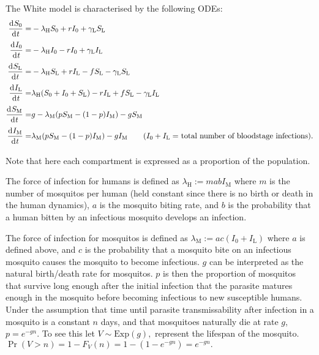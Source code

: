 The White model is characterised by the following
ODEs:
\begin{align*}
    \frac{\diff S_0}{\diff t}
    = & -\lambda_\mathrm{H} S_0 + rI_0 + \gamma_\mathrm{L}S_\mathrm{L} \\
    \frac{\diff I_0}{\diff t}
    = & -\lambda_\mathrm{H} I_0 - rI_0 + \gamma_\mathrm{L}I_\mathrm{L} \\
    \frac{\diff S_\mathrm{L}}{\diff t}
    = & -\lambda_\mathrm{H} S_\mathrm{L} + rI_\mathrm{L}
    - fS_\mathrm{L} -\gamma_\mathrm{L}S_\mathrm{L}                     \\
    \frac{\diff I_\mathrm{L}}{\diff t}
    = & \lambda_\mathrm{H} (S_0 + I_0 + S_\mathrm{L}) - rI_\mathrm{L}
    + fS_\mathrm{L} -\gamma_\mathrm{L}I_\mathrm{L}                     \\
    \frac{\diff S_\mathrm{M}}{\diff t}
    = & g - \lambda_\mathrm{M}(pS_\mathrm{M}
    - (1 - p)I_\mathrm{M}) - gS_\mathrm{M}                             \\
    \frac{\diff I_\mathrm{M}}{\diff t}
    = & \lambda_\mathrm{M}(pS_\mathrm{M} - (1 - p)I_\mathrm{M})
    - gI_\mathrm{M}
    \tag{$I_0 + I_\mathrm{L}=$ total number of bloodstage infections}.
\end{align*}

Note that here each compartment is expressed as a proportion of the population.

The force of infection for humans is defined as
$\lambda_\mathrm{H} := mabI_\mathrm{M}$ where $m$ is the number of mosquitos
per human (held constant since there is no birth or death in the human
dynamics), $a$ is the mosquito biting rate, and $b$ is the probability that a
human bitten by an infectious mosquito develops an infection.

The force of infection for mosquitos is defined as
$\lambda_\mathrm{M} := ac(I_0 + I_\mathrm{L})$ where $a$ is defined above,
and $c$ is the probability that a mosquito bite on an infectious mosquito
causes the mosquito to become infectious. $g$ can be interpreted as the natural
birth/death rate for mosquitos. $p$ is then the proportion of mosquitos that
survive long enough after the initial infection that the parasite matures
enough in the mosquito before becoming infectious to new susceptible humans.
Under the assumption that time until parasite transmissability after
infection in a mosquito is a constant $n$ days, and that mosquitoes naturally
die at rate $g$, $p=e^{-gn}.$ To see this let $V\sim\mathrm{Exp}(g),$
represent the lifespan of the mosquito.
$\Pr(V > n)= 1 - F_V(n) = 1 - (1 - e^{-gn}) = e^{-gn}.$

